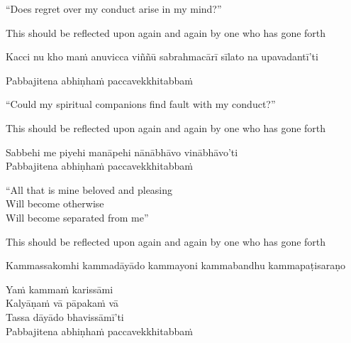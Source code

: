 \begin{english-verses}
  ``Does regret over my conduct arise in my mind?''
  \begin{english-hangtogether-verses}
    This should be reflected upon again and again by one who has gone forth
  \end{english-hangtogether-verses}
\end{english-verses}

\vspace{8pt}

\begin{pali-hangtogether}
  Kacci nu kho maṁ anuvicca viññū sabrahmacārī sīlato na upavadantī'ti
\end{pali-hangtogether}
Pabbajitena abhiṇhaṁ paccavekkhitabbaṁ

\begin{english-verses}
  ``Could my spiritual companions find fault with my conduct?''
  \begin{english-hangtogether-verses}
    This should be reflected upon again and again by one who has gone forth
  \end{english-hangtogether-verses}
\end{english-verses}

Sabbehi me piyehi manāpehi nānābhāvo vinābhāvo'ti\\
Pabbajitena abhiṇhaṁ paccavekkhitabbaṁ

\begin{english-verses}
  ``All that is mine beloved and pleasing\\
  Will become otherwise\\
  Will become separated from me''
  \begin{english-hangtogether-verses}
    This should be reflected upon again and again by one who has gone forth
  \end{english-hangtogether-verses}
\end{english-verses}

\vspace{8pt}

\begin{pali-hangtogether}
  Kammassakomhi kammadāyādo kammayoni kammabandhu kammapaṭisaraṇo\\
\end{pali-hangtogether}
Yaṁ kammaṁ karissāmi\\
Kalyāṇaṁ vā pāpakaṁ vā\\
Tassa dāyādo bhavissāmī'ti\\
Pabbajitena abhiṇhaṁ paccavekkhitabbaṁ

